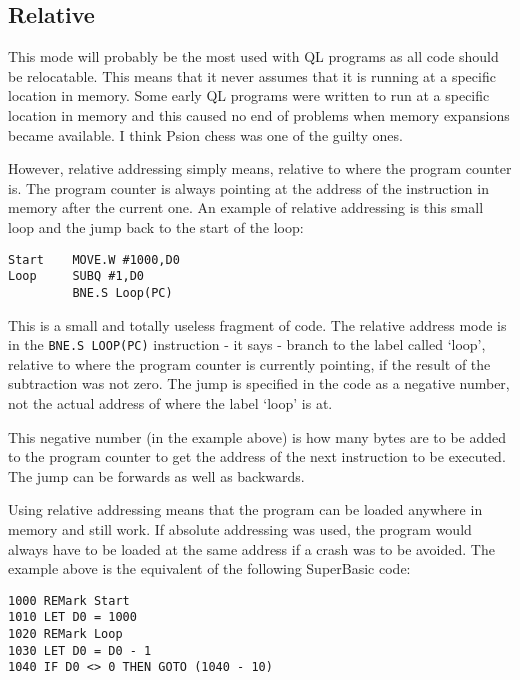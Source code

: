 \subsection{Relative}\address{Relative}

This mode will probably be the most used with QL programs as all
      code should be relocatable. This means that it never assumes that it is
      running at a specific location in memory. Some early QL programs were
      written to run at a specific location in memory and this caused no end
      of problems when memory expansions became available. I think Psion chess
      was one of the guilty ones.

However, relative addressing simply means, relative to where the
      program counter is. The program counter is always pointing at the
      address of the instruction in memory after the current one. An example
      of relative addressing is this small loop and the jump back to the start
      of the loop:

\begin{lstlisting}[firstnumber=1,]
Start    MOVE.W #1000,D0
Loop     SUBQ #1,D0
         BNE.S Loop(PC)  
\end{lstlisting}

This is a small and totally useless fragment of code. The relative
      address mode is in the \lstinline{BNE.S LOOP(PC)} instruction -{} it says -{} branch to
      the label called `loop', relative to where the program counter is
      currently pointing, if the result of the subtraction was not zero. The
      jump is specified in the code as a negative number, not the actual
      address of where the label `loop' is at.

This negative number (in the example above) is how many bytes are
      to be added to the program counter to get the address of the next
      instruction to be executed. The jump can be forwards as well as
      backwards.

Using relative addressing means that the program can be loaded
      anywhere in memory and still work. If absolute addressing was used, the
      program would always have to be loaded at the same address if a crash
      was to be avoided. The example above is the equivalent of the following
      SuperBasic code:

\begin{lstlisting}[firstnumber=1,language={[Visual]Basic}]
1000 REMark Start
1010 LET D0 = 1000
1020 REMark Loop
1030 LET D0 = D0 - 1
1040 IF D0 <> 0 THEN GOTO (1040 - 10)
\end{lstlisting}

